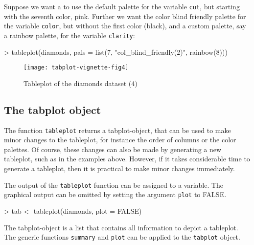 \documentclass[11pt, fleqn, a4paper]{article}
\begin{document}
Suppose we want a to use the default palette for the variable {\tt cut}, but starting with the seventh color, pink. Further we want the color blind friendly palette for the variable {\tt color}, but without the first color (black), and a custom palette, say a rainbow palette, for the variable {\tt clarity}:

\begin{Schunk}
\begin{Sinput}
> tableplot(diamonds, pals = list(7, "col_blind_friendly(2)", rainbow(8)))
\end{Sinput}
\end{Schunk}

\begin{figure}[htp]
\begin{center}
\texttt{[image: tabplot-vignette-fig4]}
\end{center}
\caption{Tableplot of the diamonds dataset (4)}
\label{fig:tp4}
\end{figure}

\subsection{The tabplot object}

The function {\tt tableplot} returns a tabplot-object, that can be used to make minor changes to the tableplot, for instance the order of columns or the color palettes. Of course, these changes can also be made by generating a new tableplot, such as in the examples above. However, if it takes considerable time to generate a tableplot, then it is practical to make minor changes immediately.

The output of the {\tt tableplot} function can be assigned to a variable. The graphical output can be omitted by setting the argument {\tt plot} to FALSE.

\begin{Schunk}
\begin{Sinput}
> tab <- tableplot(diamonds, plot = FALSE)
\end{Sinput}
\end{Schunk}

The tabplot-object is a list that contains all information to depict a tableplot. The generic functions {\tt summary} and {\tt plot} can be applied to the {\tt tabplot} object.
\end{document}
